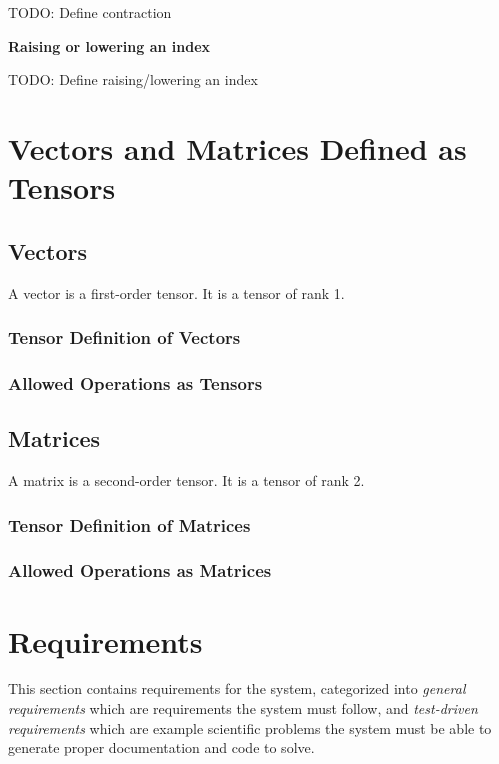 \documentclass[12pt]{article}
\begin{document}
\noindent TODO: Define contraction

\medskip
\noindent\textbf{Raising or lowering an index}

\noindent TODO: Define raising/lowering an index


\section{Vectors and Matrices Defined as Tensors}\label{Sec:VecMatAsTensors}

\subsection{Vectors}
A vector is a first-order tensor. It is a tensor of rank 1.

\subsubsection{Tensor Definition of Vectors}

\subsubsection{Allowed Operations as Tensors}

\subsection{Matrices}
A matrix is a second-order tensor. It is a tensor of rank 2.

\subsubsection{Tensor Definition of Matrices}

\subsubsection{Allowed Operations as Matrices}


\section{Requirements}\label{Sec:Req}
This section contains requirements for the system, categorized into
\textit{general requirements} which are requirements the system must
follow, and \textit{test-driven requirements} which are example scientific
problems the system must be able to generate proper documentation and 
code to solve.
\end{document}
